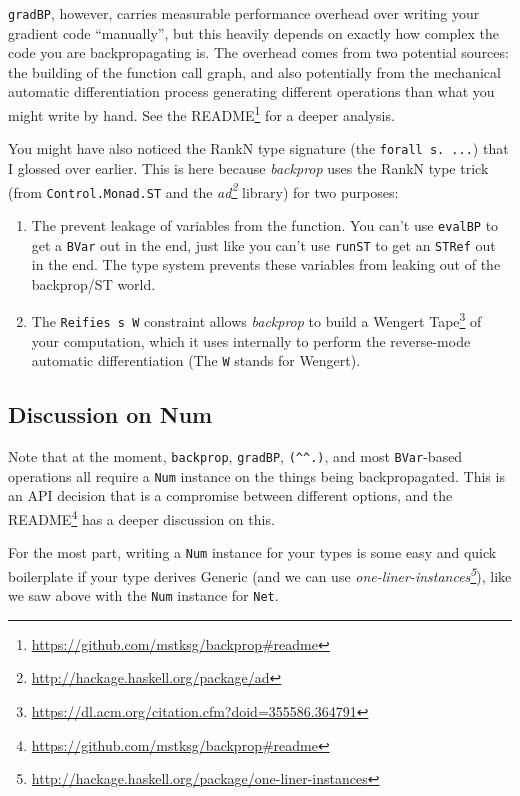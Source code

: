 \documentclass[]{article}
\renewcommand{\href}[2]{#2\footnote{\url{#1}}}
\begin{document}
\texttt{gradBP}, however, carries measurable performance overhead over writing
your gradient code ``manually'', but this heavily depends on exactly how complex
the code you are backpropagating is. The overhead comes from two potential
sources: the building of the function call graph, and also potentially from the
mechanical automatic differentiation process generating different operations
than what you might write by hand. See the
\href{https://github.com/mstksg/backprop\#readme}{README} for a deeper analysis.

You might have also noticed the RankN type signature (the
\texttt{forall\ s.\ ...}) that I glossed over earlier. This is here because
\emph{backprop} uses the RankN type trick (from \texttt{Control.Monad.ST} and
the \emph{\href{http://hackage.haskell.org/package/ad}{ad}} library) for two
purposes:

\begin{enumerate}
\def\labelenumi{\arabic{enumi}.}
\tightlist
\item
  The prevent leakage of variables from the function. You can't use
  \texttt{evalBP} to get a \texttt{BVar} out in the end, just like you can't use
  \texttt{runST} to get an \texttt{STRef} out in the end. The type system
  prevents these variables from leaking out of the backprop/ST world.
\item
  The \texttt{Reifies\ s\ W} constraint allows \emph{backprop} to build a
  \href{https://dl.acm.org/citation.cfm?doid=355586.364791}{Wengert Tape} of
  your computation, which it uses internally to perform the reverse-mode
  automatic differentiation (The \texttt{W} stands for Wengert).
\end{enumerate}

\subsection{Discussion on Num}\label{discussion-on-num}

Note that at the moment, \texttt{backprop}, \texttt{gradBP},
\texttt{(\^{}\^{}.)}, and most \texttt{BVar}-based operations all require a
\texttt{Num} instance on the things being backpropagated. This is an API
decision that is a compromise between different options, and the
\href{https://github.com/mstksg/backprop\#readme}{README} has a deeper
discussion on this.

For the most part, writing a \texttt{Num} instance for your types is some easy
and quick boilerplate if your type derives Generic (and we can use
\emph{\href{http://hackage.haskell.org/package/one-liner-instances}{one-liner-instances}}),
like we saw above with the \texttt{Num} instance for \texttt{Net}.
\end{document}
